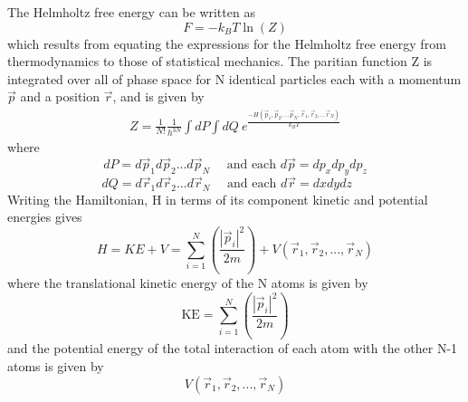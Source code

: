 \documentclass[double,12pt]{beavtex}
\begin{document}
The Helmholtz free energy can be written as
\begin{equation}{F=-k_{B}T\ln(Z)}\end{equation}
which results from equating the expressions for the Helmholtz free energy 
from thermodynamics to those of statistical mechanics. The paritian function 
Z is integrated over all of phase space for N identical particles each with 
a momentum $\vec{p}$ and a position $\vec{r}$, and is given by
\begin{align}  \label{Z_total}
     Z=\frac{1}{N!}\frac{1}{h^{3N}}\int{dP}\int{dQ}~e^\frac{-H(\vec{p}_1,\vec{p}_2,...\vec{p}_N,\vec{r}_1, \vec{r}_2,...\vec{r}_N)}{k_BT}
\end{align}
where
\begin{displaymath}{dP=d\vec{p}_1d\vec{p}_2...d\vec{p}_N \mbox{~~~~and~each~} d\vec{p}=dp_xdp_ydp_z}\end{displaymath}
\begin{displaymath}{dQ=d\vec{r}_1d\vec{r}_2...d\vec{r}_N \mbox{~~~~and~each~} d\vec{r}=dxdydz\mbox{~~~~}}\end{displaymath}
Writing the Hamiltonian, H in terms of its component kinetic and potential energies gives
\begin{equation}\label{Hamiltonian}{H = KE + V = \sum_{i=1}^N\left(\frac{|\vec{p}_i|^2}{2m}\right)+V(\vec{r}_1,\vec{r}_2,{...},\vec{r}_N)}\end{equation}
where the translational kinetic energy of the N atoms is given by 
\begin{equation}{\text{KE}=\sum_{i=1}^N\left(\frac{|\vec{p}_i|^2}{2m}\right)}\end{equation}
and the potential energy of the total interaction of each atom with the other 
N-1 atoms is given by
\begin{displaymath}{V(\vec{r}_1,\vec{r}_2,{...},\vec{r}_N)}\end{displaymath} 
\end{document}
